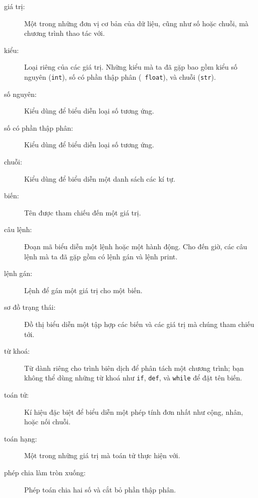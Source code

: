 \documentclass[11pt]{book}
\begin{document}
\begin{description}

\item[giá trị:]  Một trong những đơn vị cơ bản của dữ liệu, cũng
như số hoặc chuỗi, mà chương trình thao tác với.

\item[kiểu:] Loại riêng của các giá trị. Những kiểu mà ta đã
gặp bao gồm kiểu số nguyên ({\tt int}), số có phần thập phân ({\tt
float}), và chuỗi ({\tt str}).

\item[số nguyên:] Kiểu dùng để biểu diễn loại số tương ứng.

\item[số có phần thập phân:] Kiểu dùng để biểu diễn loại số tương ứng.

\item[chuỗi:] Kiểu dùng để biểu diễn một danh sách các kí tự.

\item[biến:]  Tên được tham chiếu đến một giá trị.

\item[câu lệnh:]  Đoạn mã biểu diễn một lệnh hoặc một hành động.
Cho đến giờ, các câu lệnh mà ta đã gặp gồm có lệnh gán và lệnh print.

\item[lệnh gán:]  Lệnh để gán một giá trị cho một biến.

\item[sơ đồ trạng thái:]  Đồ thị biểu diễn một tập hợp các biến và các
giá trị mà chúng tham chiếu tới.

\item[từ khoá:]  Từ dành riêng cho trình biên dịch để phân tách
một chương trình; bạn không thể dùng những từ khoá như {\tt if}, {\tt  def}, và {\tt while} để đặt tên biến.

\item[toán tử:]  Kí hiệu đặc biệt để biểu diễn một phép tính đơn nhất
như cộng, nhân, hoặc nối chuỗi.

\item[toán hạng:]  Một trong những giá trị mà toán tử thực hiện với.

\item[phép chia làm tròn xuống:]  Phép toán chia hai số và cắt bỏ phần
thập phân.


\end{description}
\end{document}
